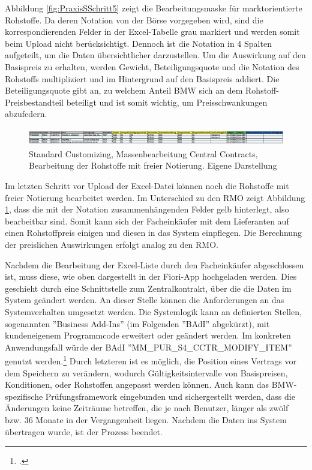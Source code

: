 Abbildung \ref{fig:PraxisSSchritt5} zeigt die Bearbeitungsmaske für marktorientierte Rohstoffe. Da deren Notation von der Börse vorgegeben wird, sind die korrespondierenden Felder in der Excel-Tabelle grau markiert und werden somit beim Upload nicht berücksichtigt. Dennoch ist die Notation in 4 Spalten aufgeteilt, um die Daten übersichtlicher darzustellen. Um die Auswirkung auf den Basispreis zu erhalten, werden Gewicht, Beteiligungsquote und die Notation des Rohstoffs multipliziert und im Hintergrund auf den Basispreis addiert. Die Beteiligungsquote gibt an, zu welchem Anteil BMW sich an dem Rohstoff-Preisbestandteil beteiligt und ist somit wichtig, um Preisschwankungen abzufedern.

\begin{figure}[H]
    \centering
    \includegraphics[height=0.75cm]{Bilder/Praxisteil-S-Schritt-6.png}
    \caption[Standard Customizing, Massenbearbeitung Central Contracts, Bearbeitung der Rohstoffe mit freier Notierung]{Standard Customizing, Massenbearbeitung Central Contracts, Bearbeitung der Rohstoffe mit freier Notierung. Eigene Darstellung}
    \label{fig:PraxisSSchritt6}
\end{figure}

Im letzten Schritt vor Upload der Excel-Datei können noch die Rohstoffe mit freier Notierung bearbeitet werden. Im Unterschied zu den RMO zeigt Abbildung \ref{fig:PraxisSSchritt6}, dass die mit der Notation zusammenhängenden Felder gelb hinterlegt, also bearbeitbar sind. Somit kann sich der Facheinkäufer mit dem Lieferanten auf einen Rohstoffpreis einigen und diesen in das System einpflegen. Die Berechnung der preislichen Auswirkungen erfolgt analog zu den RMO.

Nachdem die Bearbeitung der Excel-Liste durch den Facheinkäufer abgeschlossen ist, muss diese, wie oben dargestellt in der Fiori-App hochgeladen werden. Dies geschieht durch eine Schnittstelle zum Zentralkontrakt, über die die Daten im System geändert werden. An dieser Stelle können die Anforderungen an das Systemverhalten umgesetzt werden. Die Systemlogik kann an definierten Stellen, sogenannten ''Business Add-Ins'' (im Folgenden ''BAdI'' abgekürzt), mit kundeneigenem Programmcode erweitert oder geändert werden. Im konkreten Anwendungsfall würde der BAdI ''MM\_PUR\_S4\_CCTR\_MODIFY\_ITEM'' genutzt werden.\footcite[Vgl.][]{theorie_sap_central_contract_overview_2024} Durch letzteren ist es möglich, die Position eines Vertrags vor dem Speichern zu verändern, wodurch \zB Gültigkeitsintervalle von Basispreisen, Konditionen, oder Rohstoffen angepasst werden können. Auch kann das BMW-spezifische Prüfungsframework eingebunden und sichergestellt werden, dass die Änderungen keine Zeiträume betreffen, die je nach Benutzer, länger als zwölf bzw. 36 Monate in der Vergangenheit liegen. Nachdem die Daten ins System übertragen wurde, ist der Prozess beendet.

